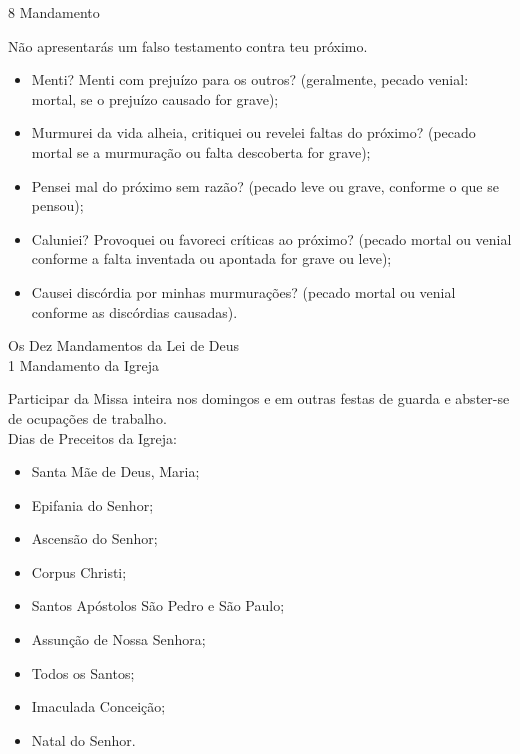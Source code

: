 \begin{center}
    8\textordmasculine{} Mandamento
\end{center}
\begin{flushleft}
    Não apresentarás um falso testamento contra teu próximo.
\end{flushleft}
\begin{itemize}
    \item Menti? Menti com prejuízo para os outros? (geralmente, pecado venial: mortal, se o prejuízo causado for grave);
    \item Murmurei da vida alheia, critiquei ou revelei faltas do próximo? (pecado mortal se a murmuração ou falta descoberta for grave);
    \item Pensei mal do próximo sem razão? (pecado leve ou grave, conforme o que se pensou);
    \item Caluniei? Provoquei ou favoreci críticas ao próximo? (pecado mortal ou venial conforme a falta inventada ou apontada for grave ou leve);
    \item Causei discórdia por minhas murmurações? (pecado mortal ou venial conforme as discórdias causadas).
\end{itemize}
\newpage
\begin{center}
    \textcolor{VioletRed2}{Os Dez Mandamentos da Lei de Deus} \\
    \hfill{} \break{}
    1\textordmasculine{} Mandamento da Igreja
\end{center}
\begin{flushleft}
    Participar da Missa inteira nos domingos e em outras festas de guarda e abster-se de ocupações de trabalho. \\
    \hfill{} \break{}
    Dias de Preceitos da Igreja:
    \begin{itemize}
        \item  Santa Mãe de Deus, Maria;
        \item Epifania do Senhor;
        \item Ascensão do Senhor;
        \item Corpus Christi;
        \item Santos Apóstolos São Pedro e São Paulo;
        \item Assunção de Nossa Senhora;
        \item Todos os Santos;
        \item Imaculada Conceição;
        \item Natal do Senhor.
    \end{itemize}
\end{flushleft}
